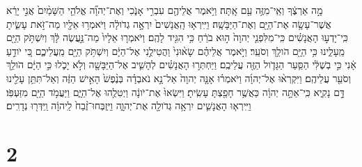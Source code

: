 \documentclass{openreader}
\begin{document}
מָ֣ה אַרְצֶ֔ךָ וְאֵֽי־מִזֶּ֥ה עַ֖ם אָֽתָּה׃ וַיֹּ֥אמֶר אֲלֵיהֶ֖ם עִבְרִ֣י אָנֹ֑כִי וְאֶת־יְהוָ֞ה אֱלֹהֵ֤י הַשָּׁמַ֨יִם֙ אֲנִ֣י יָרֵ֔א אֲשֶׁר־עָשָׂ֥ה אֶת־הַיָּ֖ם וְאֶת־הַיַּבָּשָֽׁה׃ וַיִּֽירְא֤וּ הָֽאֲנָשִׁים֙ יִרְאָ֣ה גְדֹולָ֔ה וַיֹּאמְר֥וּ אֵלָ֖יו מַה־זֹּ֣את עָשִׂ֑יתָ כִּֽי־יָדְע֣וּ הָאֲנָשִׁ֗ים כִּֽי־מִלִּפְנֵ֤י יְהוָה֙ ה֣וּא בֹרֵ֔חַ כִּ֥י הִגִּ֖יד לָהֶֽם׃ וַיֹּאמְר֤וּ אֵלָיו֙ מַה־נַּ֣עֲשֶׂה לָּ֔ךְ וְיִשְׁתֹּ֥ק הַיָּ֖ם מֵֽעָלֵ֑ינוּ כִּ֥י הַיָּ֖ם הֹולֵ֥ךְ וְסֹעֵֽר׃ וַיֹּ֣אמֶר אֲלֵיהֶ֗ם שָׂא֨וּנִי֙ וַהֲטִילֻ֣נִי אֶל־הַיָּ֔ם וְיִשְׁתֹּ֥ק הַיָּ֖ם מֵֽעֲלֵיכֶ֑ם כִּ֚י יֹודֵ֣עַ אָ֔נִי כִּ֣י בְשֶׁלִּ֔י הַסַּ֧עַר הַגָּדֹ֛ול הַזֶּ֖ה עֲלֵיכֶֽם׃ וַיַּחְתְּר֣וּ הָאֲנָשִׁ֗ים לְהָשִׁ֛יב אֶל־הַיַּבָּשָׁ֖ה וְלֹ֣א יָכֹ֑לוּ כִּ֣י הַיָּ֔ם הֹולֵ֥ךְ וְסֹעֵ֖ר עֲלֵיהֶֽם׃ וַיִּקְרְא֨וּ אֶל־יְהוָ֜ה וַיֹּאמְר֗וּ אָנָּ֤ה יְהוָה֙ אַל־נָ֣א נֹאבְדָ֗ה בְּנֶ֨פֶשׁ֙ הָאִ֣ישׁ הַזֶּ֔ה וְאַל־תִּתֵּ֥ן עָלֵ֖ינוּ דָּ֣ם נָקִ֑יא כִּֽי־אַתָּ֣ה יְהוָ֔ה כַּאֲשֶׁ֥ר חָפַ֖צְתָּ עָשִֽׂיתָ׃ וַיִּשְׂאוּ֙ אֶת־יֹונָ֔ה וַיְטִלֻ֖הוּ אֶל־הַיָּ֑ם וַיַּעֲמֹ֥ד הַיָּ֖ם מִזַּעְפֹּֽו׃ וַיִּֽירְא֧וּ הָאֲנָשִׁ֛ים יִרְאָ֥ה גְדֹולָ֖ה אֶת־יְהוָ֑ה וַיִּֽזְבְּחוּ־זֶ֨בַח֙ לַֽיהוָ֔ה וַֽיִּדְּר֖וּ נְדָרִֽים׃ \section*{2}
\end{document}

